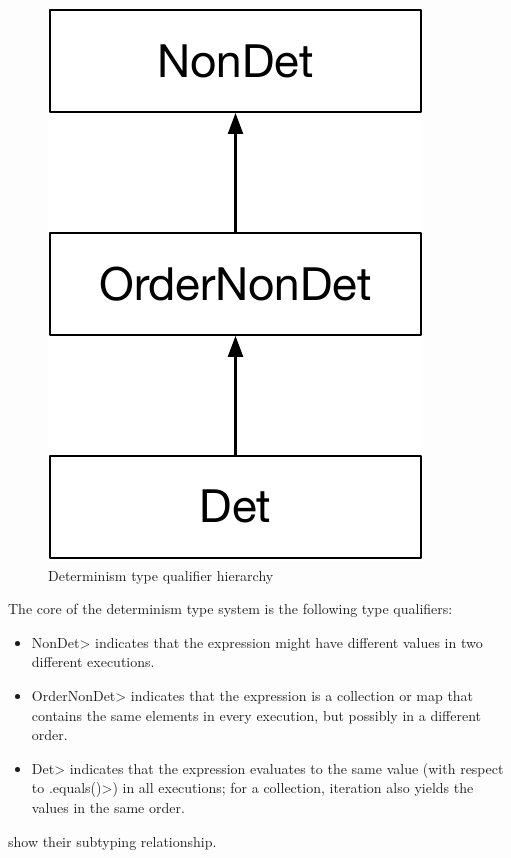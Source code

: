 \begin{figure}
    \begin{center}
        \includegraphics[scale=0.37]{detHierarchy}
    \end{center}
    \caption{Determinism type qualifier hierarchy}
    \label{fig:determinism-hierarchy}
\end{figure}

The core of the determinism type system is the following type qualifiers:
\begin{itemize}
    \item \<NonDet> indicates
    that the expression might have different values in two different executions.
    \item \<OrderNonDet> indicates that the expression is a collection or
      map that contains the same elements in every execution, but possibly
      in a different order.
    \item \<Det> indicates that
    the expression evaluates to the same value (with respect to \<.equals()>) in all
    executions; for a collection, iteration also yields the values in the same
    order.
\end{itemize}
 show their subtyping relationship.

